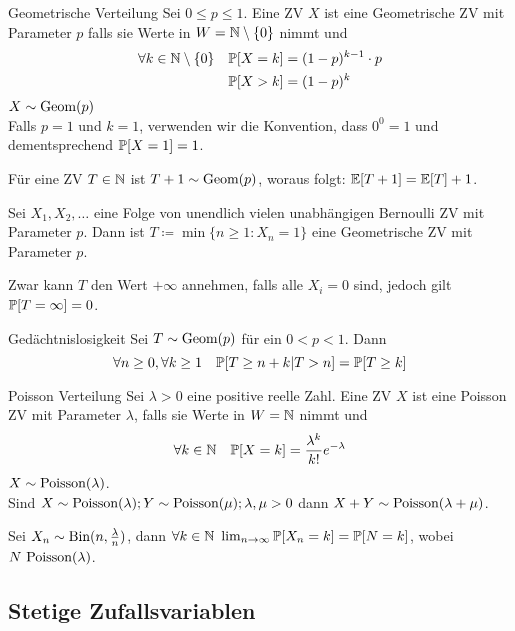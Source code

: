 \begin{definition}{Geometrische Verteilung}
	Sei $0 \leq p \leq 1$. Eine ZV $X$ ist eine Geometrische ZV mit Parameter $p$ falls sie Werte in $W = \mathbb{N} \setminus \{0\}$
	nimmt und
	\begin{align*}
		\forall k \in \mathbb{N} \setminus \{0\} \quad \mathbb{P} [X = k] &= (1-p)^{k-1} \cdot p\\
		\mathbb{P}[X > k] &= (1 - p)^k
	\end{align*}
	$X \sim \text{Geom} (p)$\\
	Falls $p = 1$ und $k = 1$, verwenden wir die Konvention, dass $0^0 = 1$ und dementsprechend $\mathbb{P} [X = 1] = 1$.
\end{definition}
Für eine ZV $T \in \mathbb{N}$ ist $T + 1 \sim \text{Geom} (p)$, woraus folgt: $\mathbb{E} [T + 1] = \mathbb{E} [T] + 1$.
\begin{prop}
	Sei $X_1 , X_2 , \ldots$ eine Folge von unendlich vielen unabhängigen Bernoulli ZV mit Parameter $p$. Dann ist $T
	\coloneqq \min \{n \geq 1 : X_n = 1\}$ eine Geometrische ZV mit Parameter $p$.
\end{prop}
Zwar kann $T$ den Wert $+ \infty$ annehmen, falls alle $X_i = 0$ sind, jedoch gilt $\mathbb{P} [T = \infty] = 0$.
\begin{tprop}{Gedächtnislosigkeit}
	Sei $T  \sim \text{Geom} (p)$ für ein $0 < p < 1$. Dann
	\begin{equation*}
		\forall n \geq 0, \forall k \geq 1 \quad \mathbb{P} [T \geq n + k | T > n] = \mathbb{P} [T \geq k]
	\end{equation*}
\end{tprop}
\begin{definition}{Poisson Verteilung}
	Sei $ \lambda > 0$ eine positive reelle Zahl. Eine ZV $X$ ist eine Poisson ZV mit Parameter $\lambda$, falls sie
	Werte in $W = \mathbb{N}$ nimmt und 
	\begin{equation*}
		\forall k \in \mathbb{N} \quad \mathbb{P} [X = k] = \frac{\lambda^k}{k!} e^{-\lambda}
	\end{equation*}
	$X \sim \text{Poisson} (\lambda)$.\\
	Sind $X \sim \text{Poisson} (\lambda); Y \sim \text{Poisson} (\mu); \lambda, \mu > 0$ dann $X + Y \sim \text{Poisson} (\lambda + \mu)$.
\end{definition}
Sei $X_n \sim \text{Bin} (n, \frac{\lambda}{n} )$, dann $\forall k \in \mathbb{N} ~ \lim_{n \rightarrow \infty} \mathbb{P} [X_n = k] = \mathbb{P} [N
= k]$, wobei $N ~ \text{Poisson} (\lambda)$.


\subsection{Stetige Zufallsvariablen}%
\label{sub:stetige_zufallsvariablen}

